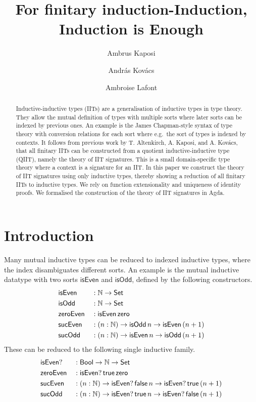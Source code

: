 \documentclass[a4paper,UKenglish,cleveref, autoref]{lipics-v2019}
\title{For finitary induction-Induction, Induction is Enough} %
\author{Ambrus Kaposi}{E{\"o}tv{\"o}s Lor{\'a}nd University, Budapest, Hungary}{akaposi@inf.elte.hu}{https://orcid.org/0000-0001-9897-8936}{this author was supported by Thematic Excellence Programme, Industry and Digitization Subprogramme (NRDI Office, 2019) and by the European Union, co-financed by the European Social Fund (EFOP-3.6.2-16-2017-00013, Thematic Fundamental Research Collaborations Grounding Innovation in Informatics and Infocommunication).}%
\author{Andr{\'a}s Kov{\'a}cs}{E{\"o}tv{\"o}s Lor{\'a}nd University, Budapest, Hungary}{kovacsandras@inf.elte.hu}{https://orcid.org/0000-0002-6375-9781}{this author was supported by the European Union, co-financed by the European Social Fund (EFOP-3.6.3-VEKOP-16-2017-00002).}
\author{Ambroise Lafont}{IMT Atlantique, Inria, LS2N CNRS, Nantes, France}{ambroise.lafont@inria.fr}{https://orcid.org/0000-0002-9299-641X}{}
\begin{document}
\maketitle

\begin{abstract}
  Inductive-inductive types (IITs) are a generalisation of inductive types in
  type theory. They allow the mutual definition of types with multiple sorts
  where later sorts can be indexed by previous ones. An example is the James
  Chapman-style syntax of type theory with conversion relations for each sort
  where e.g.\ the sort of types is indexed by contexts. It follows from previous
  work by T. Altenkirch, A. Kaposi, and A. Kov{\'a}cs, that all finitary IITs can be constructed from a quotient
  inductive-inductive type (QIIT), namely the theory of IIT signatures. This is
  a small domain-specific type theory where a context is a signature for an
  IIT. In this paper we construct the theory of IIT signatures using only inductive types,
  thereby showing a reduction of all finitary IITs to inductive types.  We rely
  on function extensionality and uniqueness of identity proofs. We formalised
  the construction of the theory of IIT signatures in Agda.
\end{abstract}

\section{Introduction}
\label{sec:intro}

Many mutual inductive types can be reduced to indexed inductive types, where the
index disambiguates different sorts. An example is the mutual inductive datatype
with two sorts
$\mathsf{isEven}$ and $\mathsf{isOdd}$, defined by the following
constructors.
\begin{alignat*}{5}
  & \mathsf{isEven} && : \mathbb{N}\rightarrow\mathsf{Set} \\
  & \mathsf{isOdd} && : \mathbb{N}\rightarrow \mathsf{Set} \\
  & \mathsf{zeroEven} && : \mathsf{isEven}\,\mathsf{zero} \\
  & \mathsf{sucEven} && : (n:\mathbb{N})\rightarrow\mathsf{isOdd}\,n\rightarrow\mathsf{isEven}\,(n+1) \\
  & \mathsf{sucOdd} && : (n:\mathbb{N})\rightarrow\mathsf{isEven}\,n\rightarrow\mathsf{isOdd}\,(n+1)
\end{alignat*}
These can be reduced to the following single inductive family.
\begin{alignat*}{5}
  & \mathsf{isEven?} && : \mathsf{Bool}\rightarrow\mathbb{N}\rightarrow\mathsf{Set} \\
  & \mathsf{zeroEven} && : \mathsf{isEven?}\,\mathsf{true}\,\mathsf{zero} \\
  & \mathsf{sucEven} && : (n:\mathbb{N})\rightarrow\mathsf{isEven?}\,\mathsf{false}\,n\rightarrow\mathsf{isEven?}\,\mathsf{true}\,(n+1) \\
  & \mathsf{sucOdd} && : (n:\mathbb{N})\rightarrow\mathsf{isEven?}\,\mathsf{true}\,n\rightarrow\mathsf{isEven?}\,\mathsf{false}\,(n+1)
\end{alignat*}
\end{document}
